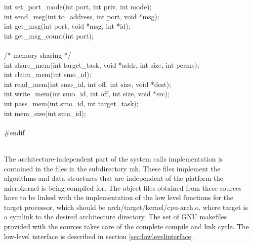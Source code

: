 \documentclass[11pt, letterpaper, twoside, english]{book}
\begin{document}
\begin{sf}
int set\_port\_mode(int port, int priv, int mode);\\
int send\_msg(int to\_address, int port, void *msg); \\
int get\_msg(int port, void *msg, int *id); \\
int get\_msg\_count(int port); \\
\\
/* memory sharing */ \\
int share\_mem(int target\_task, void *addr, int size, int perms); \\
int claim\_mem(int smo\_id); \\
int read\_mem(int smo\_id, int off, int size, void *dest); \\
int write\_mem(int smo\_id, int off, int size, void *src); \\ 
int pass\_mem(int smo\_id, int target\_task); \\
int mem\_size(int smo\_id); \\
\\
\#endif \\ \\
\end{sf}
The architecture-independent part of the system calls implementation is contained in the files in the subdirectory \textsf{mk}. These files implement the algorithms and data structures that are independent of the platform the microkernel is being compiled for. The object files obtained from these sources have to be linked with the implementation of the low level functions for the target processor, which should be \textsf{arch/target/kernel/cpu-arch.o}, where \textsf{target} is a symlink to the desired architecture directory. The set of GNU makefiles provided with the sources takes care of the complete compile and link cycle.  The low-level interface is described in section \ref{sec:lowlevelinterface}. 
\end{document}
